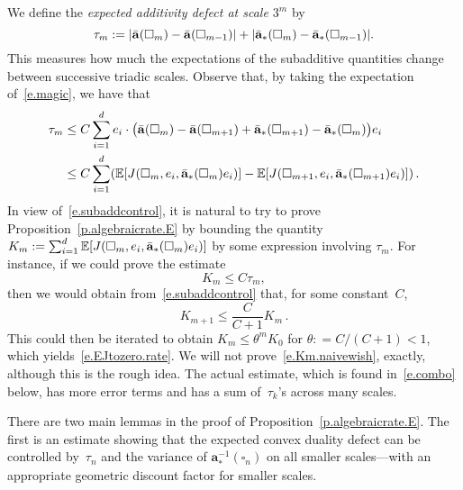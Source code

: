 \documentclass[11pt]{article} %
\let\oldsquare\square %
\renewcommand{\square}{\oldsquare}
\numberwithin{equation}{section}
\theoremstyle{definition}
\let\originalleft\left
\let\originalright\right
\renewcommand{\left}{\mathopen{}\mathclose\bgroup\originalleft}
\renewcommand{\right}{\aftergroup\egroup\originalright}
\renewcommand{\a}{\mathbf{a}}
\newcommand{\ahom}{\bar{\a}}
\newcommand{\cu}{\square}
\newcommand{\E}{\mathbb{E}}
\begin{document}
We define the \emph{expected additivity defect at scale $3^m$} by
\begin{equation}
\label{e.taun}
\tau_m := \left|\ahom (\cu_m) - \ahom(\cu_{m-1} )\right| + \left|  \ahom_*(\cu_m) - \ahom_*(\cu_{m-1} )\right|.
\end{equation}
This measures how much the expectations of the subadditive quantities change between successive triadic scales. 
Observe that, by taking the expectation of~\eqref{e.magic}, we have that
\begin{align}
\label{e.subaddcontrol}
\tau_m
& 
\leq 
C \sum_{i=1}^d  e_i \cdot  
\bigl(\ahom(\cu_{m}) - \ahom(\cu_{m+1}) + \ahom_*(\cu_{m+1}) - \ahom_*(\cu_{m})   \bigr)  e_i
\notag \\ & 
\leq
C \sum_{i=1}^d \left( \E \left[ J(\cu_m,e_i,\ahom_*(\cu_m) e_i)\right] - \E \left[ J(\cu_{m+1},e_i,\ahom_*(\cu_{m+1}) e_i)\right] \right)
\,.
\end{align}
In view of~\eqref{e.subaddcontrol}, it is natural to try to prove Proposition~\ref{p.algebraicrate.E} by bounding the quantity $K_m:= \sum_{i=1}^d \E \left[ J(\cu_{m},e_i,\ahom_*(\cu_m) e_i)\right]$ by some expression involving $\tau_m$. For instance, if we could prove the estimate 
\begin{equation}
\label{e.Km.naivewish}
K_m \leq C\tau_m, 
\end{equation}
then we would obtain from~\eqref{e.subaddcontrol} that, for some constant~$C$,
\begin{equation*}
K_{m+1} \leq \frac{C}{C+1} K_m
\,.
\end{equation*}
This could then be iterated to obtain 
$K_m \leq \theta^m K_0$ for $\theta : = C/(C+1)<1$, which yields~\eqref{e.EJtozero.rate}. We will not prove~\eqref{e.Km.naivewish}, exactly, although this is the rough idea. The actual estimate, which is found in~\eqref{e.combo} below, has more error terms and has a sum of~$\tau_k$'s across many scales. 

\smallskip

There are two main lemmas in the proof of Proposition~\ref{p.algebraicrate.E}. The first is an estimate showing that the expected convex duality defect can be controlled by~$\tau_n$ and the variance of $\a_*^{-1}(\cu_n)$ on all smaller scales---with an appropriate geometric discount factor for smaller scales. 
\end{document}
